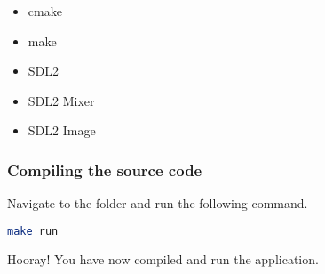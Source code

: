 \begin{itemize}
    \item cmake
    \item make
    \item SDL2
    \item SDL2 Mixer
    \item SDL2 Image
\end{itemize}

\subsubsection{Compiling the source code}
Navigate to the  folder and run the 
following command.

\begin{lstlisting}[language=bash]
make run
\end{lstlisting}

Hooray! You have now compiled and run the application.
